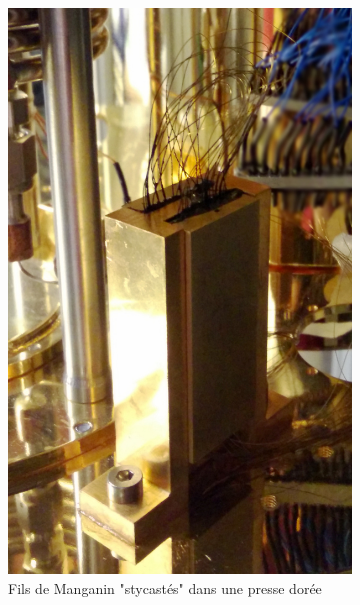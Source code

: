 \begin{figure}
    \centering
    \begin{subfigure}[t]{0.5\textwidth}
        \centering
        \includegraphics[height=1.2\textwidth]{Images/Thermalisation/DC}
        \caption{Fils de Manganin "stycastés" dans une presse dorée}
    \end{subfigure}%
    ~ 
    \begin{subfigure}[t]{0.5\textwidth}
        \centering

\end{subfigure}
\end{figure}
